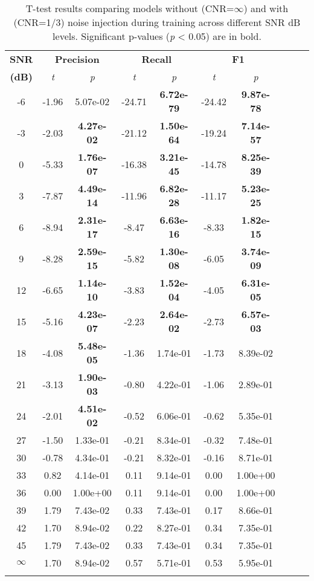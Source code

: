 \documentclass{article}
\begin{document}
\begin{table}[h!]
\centering
\caption{T-test results comparing models without (CNR=$\infty$) and with (CNR=1/3) noise injection during training across different SNR dB levels. Significant p-values (\textit{p} < 0.05) are in bold.}
\scriptsize
\begin{tabular}{@{}c ccc ccc ccc@{}} %
\toprule
\textbf{SNR} & \multicolumn{2}{c}{\textbf{Precision}} & \multicolumn{2}{c}{\textbf{Recall}} & \multicolumn{2}{c}{\textbf{F1}} \\ 
\textbf{(dB)} & \textit{t} & \textit{p} & \textit{t} & \textit{p} & \textit{t} & \textit{p} \\
\midrule
-6  & -1.96  & 5.07e-02  & -24.71  & \textbf{6.72e-79}  & -24.42  & \textbf{9.87e-78} \\
-3  & -2.03  & \textbf{4.27e-02}  & -21.12  & \textbf{1.50e-64}  & -19.24  & \textbf{7.14e-57} \\
0   & -5.33  & \textbf{1.76e-07}  & -16.38  & \textbf{3.21e-45}  & -14.78  & \textbf{8.25e-39} \\
3   & -7.87  & \textbf{4.49e-14}  & -11.96  & \textbf{6.82e-28}  & -11.17  & \textbf{5.23e-25} \\
6   & -8.94  & \textbf{2.31e-17}  & -8.47   & \textbf{6.63e-16}  & -8.33   & \textbf{1.82e-15} \\
9   & -8.28  & \textbf{2.59e-15}  & -5.82   & \textbf{1.30e-08}  & -6.05   & \textbf{3.74e-09} \\
12  & -6.65  & \textbf{1.14e-10}  & -3.83   & \textbf{1.52e-04}  & -4.05   & \textbf{6.31e-05} \\
15  & -5.16  & \textbf{4.23e-07}  & -2.23   & \textbf{2.64e-02}  & -2.73   & \textbf{6.57e-03} \\
18  & -4.08  & \textbf{5.48e-05}  & -1.36   & 1.74e-01  & -1.73   & 8.39e-02 \\
21  & -3.13  & \textbf{1.90e-03}  & -0.80   & 4.22e-01  & -1.06   & 2.89e-01 \\
24  & -2.01  & \textbf{4.51e-02}  & -0.52   & 6.06e-01  & -0.62   & 5.35e-01 \\
27  & -1.50  & 1.33e-01  & -0.21   & 8.34e-01  & -0.32   & 7.48e-01 \\
30  & -0.78  & 4.34e-01  & -0.21   & 8.32e-01  & -0.16   & 8.71e-01 \\
33  & 0.82   & 4.14e-01  & 0.11    & 9.14e-01  & 0.00    & 1.00e+00 \\
36  & 0.00   & 1.00e+00  & 0.11    & 9.14e-01  & 0.00    & 1.00e+00 \\
39  & 1.79   & 7.43e-02  & 0.33    & 7.43e-01  & 0.17    & 8.66e-01 \\
42  & 1.70   & 8.94e-02  & 0.22    & 8.27e-01  & 0.34    & 7.35e-01 \\
45  & 1.79   & 7.43e-02  & 0.33    & 7.43e-01  & 0.34    & 7.35e-01 \\
$\infty$ & 1.70   & 8.94e-02  & 0.57    & 5.71e-01  & 0.53    & 5.95e-01 \\
\bottomrule
\label{tab:3}
\end{tabular}
\end{table}
\end{document}

